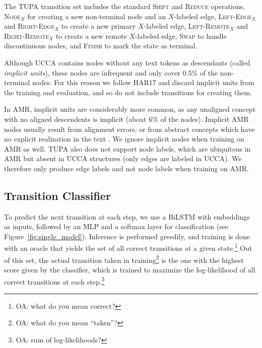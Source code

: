 \documentclass[11pt,a4paper]{article}
\newcommand{\oa}[1]{\footnote{\color{red}OA: #1}}
\begin{document}
The TUPA transition set includes
the standard \textsc{Shift} and \textsc{Reduce} operations,
\textsc{Node$_X$} for creating a new non-terminal node and an $X$-labeled edge,
\textsc{Left-Edge$_X$} and \textsc{Right-Edge$_X$} to create a new primary $X$-labeled edge,
\textsc{Left-Remote$_X$} and \textsc{Right-Remote$_X$} to create a new remote $X$-labeled edge,
\textsc{Swap} to handle discontinuous nodes,
and \textsc{Finish} to mark the state as terminal.

Although UCCA contains nodes without any text tokens as descendants
(called \textit{implicit units}),
these nodes are infrequent and only cover 0.5\% of the non-terminal nodes.
For this reason we follow HAR17 and discard implicit units from the training and evaluation,
and so do not include transitions for creating them.

In AMR, implicit units are considerably more common, as any unaligned concept
with no aligned descendents is implicit (about 6\% of the nodes).
Implicit AMR nodes usually result from alignment errors, or from abstract concepts
which have no explicit realization in the text \cite{buys2017oxford}.
We ignore implicit nodes when training on AMR as well.
TUPA also does not support node labels, 
which are ubiquitous in AMR but absent in UCCA structures (only edges are labeled in UCCA). 
We therefore only produce edge labels and not node labels when training on AMR.


\subsection{Transition Classifier}\label{sec:classifier}

To predict the next transition at each step,
we use a BiLSTM with embeddings as inputs,
followed by an MLP and a softmax layer for classification 
(see Figure~\ref{fig:single_model}).
Inference is performed greedily,
and training is done with an oracle that yields the set of all correct 
transitions at a given state.\oa{what do you mean correct?}
Out of this set, the actual transition taken in training\oa{what do you mean ``taken''?} is the one
with the highest score given by the classifier,
which is trained to maximize the log-likelihood of all 
correct transitions at each step.\oa{sum of log-likelihoods?}
\end{document}
